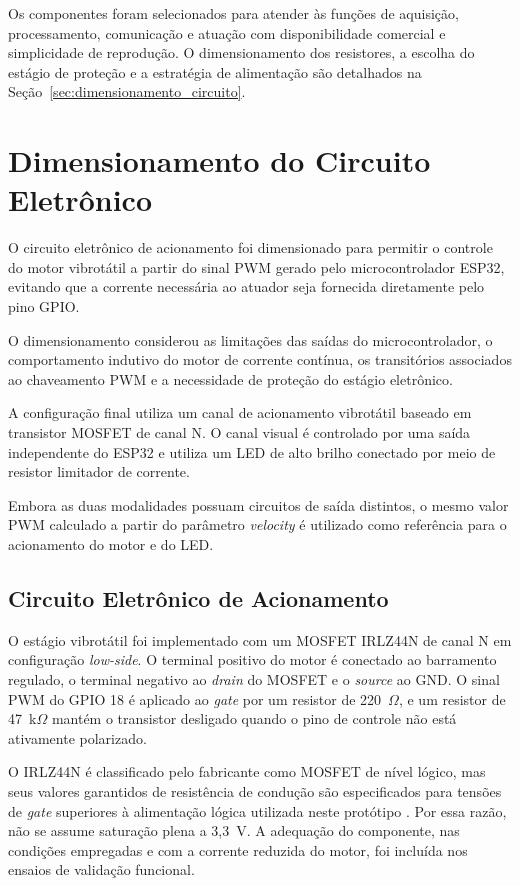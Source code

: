 Os componentes foram selecionados para atender às funções de aquisição, processamento, comunicação e atuação com disponibilidade comercial e simplicidade de reprodução. O dimensionamento dos resistores, a escolha do estágio de proteção e a estratégia de alimentação são detalhados na Seção~\ref{sec:dimensionamento_circuito}.

\section{Dimensionamento do Circuito Eletrônico}
\label{sec:dimensionamento_circuito}


O circuito eletrônico de acionamento foi dimensionado para permitir o controle do motor vibrotátil a partir do sinal PWM gerado pelo microcontrolador ESP32, evitando que a corrente necessária ao atuador seja fornecida diretamente pelo pino GPIO.

O dimensionamento considerou as limitações das saídas do microcontrolador, o comportamento indutivo do motor de corrente contínua, os transitórios associados ao chaveamento PWM e a necessidade de proteção do estágio eletrônico.

A configuração final utiliza um canal de acionamento vibrotátil baseado em transistor MOSFET de canal N. O canal visual é controlado por uma saída independente do ESP32 e utiliza um LED de alto brilho conectado por meio de resistor limitador de corrente.

Embora as duas modalidades possuam circuitos de saída distintos, o mesmo valor PWM calculado a partir do parâmetro \textit{velocity} é utilizado como referência para o acionamento do motor e do LED.

\subsection{Circuito Eletrônico de Acionamento}
\label{sec:implementacao_eletronica}

O estágio vibrotátil foi implementado com um MOSFET IRLZ44N de canal N em configuração \textit{low-side}. O terminal positivo do motor é conectado ao barramento regulado, o terminal negativo ao \textit{drain} do MOSFET e o \textit{source} ao GND. O sinal PWM do GPIO 18 é aplicado ao \textit{gate} por um resistor de 220~$\Omega$, e um resistor de 47~k$\Omega$ mantém o transistor desligado quando o pino de controle não está ativamente polarizado.

O IRLZ44N é classificado pelo fabricante como MOSFET de nível lógico, mas seus valores garantidos de resistência de condução são especificados para tensões de \textit{gate} superiores à alimentação lógica utilizada neste protótipo \cite{infineonirlz44n}. Por essa razão, não se assume saturação plena a 3,3~V. A adequação do componente, nas condições empregadas e com a corrente reduzida do motor, foi incluída nos ensaios de validação funcional.

